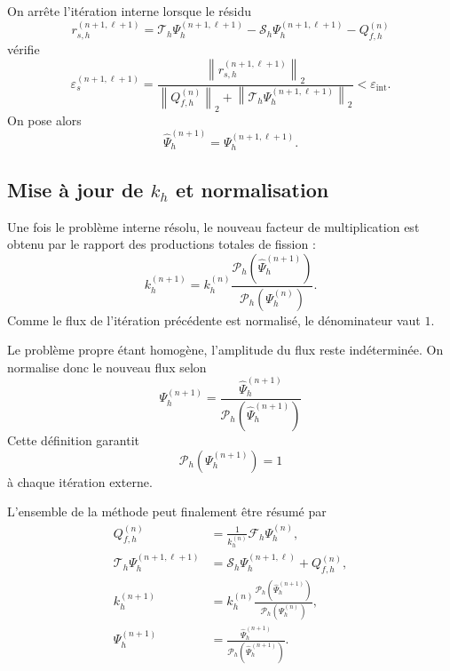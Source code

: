 \documentclass{article}
\begin{document}
On arrête l'itération interne lorsque le résidu
\begin{equation}
    r_{s,h}^{(n+1,\ell+1)}
    = \mathcal T_h\Psi_h^{(n+1,\ell+1)}
    - \mathcal S_h\Psi_h^{(n+1,\ell+1)}
    - Q_{f,h}^{(n)}
    \label{eq:residu-interne-transport}
\end{equation}
vérifie
\begin{equation}
    \varepsilon_s^{(n+1,\ell+1)}
    =
    \frac{\left\| r_{s,h}^{(n+1,\ell+1)} \right\|_2}
    {\left\| Q_{f,h}^{(n)} \right\|_2
    + \left\| \mathcal T_h \Psi_h^{(n+1,\ell+1)} \right\|_2 }
    < \varepsilon_{\mathrm{int}}.
    \label{eq:critere-interne-transport}
\end{equation}
On pose alors
\[
    \widehat{\Psi}_h^{(n+1)} = \Psi_h^{(n+1,\ell+1)}.
\]

\subsection {Mise à jour de $k_h$ et normalisation}

Une fois le problème interne résolu, le nouveau facteur de multiplication est obtenu par le rapport des productions totales de fission :
\begin{equation}
    \boxed{
        k_h^{(n+1)} = k_h^{(n)}
        \frac{\mathcal P_h\!\left( \widehat{\Psi}_h^{(n+1)} \right)}
        {\mathcal P_h\!\left( \Psi_h^{(n)}\right)}.
    }
    \label{eq:mise-a-jour-keff-transport}
\end{equation}
Comme le flux de l'itération précédente est normalisé, le dénominateur vaut $1$.

Le problème propre étant homogène, l'amplitude du flux reste indéterminée. On normalise donc le nouveau flux selon
\begin{equation}
    \boxed{
        \Psi_h^{(n+1)} =
        \frac{\widehat{\Psi}_h^{(n+1)}}
        {\mathcal P_h\!\left(\widehat{\Psi}_h^{(n+1)}\right)}
    }
    \label{eq:normalisation-transport}
\end{equation}
Cette définition garantit
\[
    \mathcal P_h\!\left(\Psi_h^{(n+1)} \right)=1
\]
à chaque itération externe.

L'ensemble de la méthode peut finalement être résumé par
\begin{equation}
\boxed{
\begin{aligned}
    Q_{f,h}^{(n)}
    &=
    \frac{1}{k_h^{(n)}}
    \mathcal F_h\Psi_h^{(n)}, \\[0.15cm]
    \mathcal T_h\Psi_h^{(n+1,\ell+1)} &= \mathcal S_h\Psi_h^{(n+1,\ell)} + Q_{f,h}^{(n)}, \\[0.15cm]
    k_h^{(n+1)}
    &=
    k_h^{(n)}
    \frac{\mathcal P_h(\widehat{\Psi}_h^{(n+1)})}
    {\mathcal P_h(\Psi_h^{(n)})},\\[0.15cm]
    \Psi_h^{(n+1)}
    &= \frac{\widehat{\Psi}_h^{(n+1)}}
    {\mathcal P_h(\widehat{\Psi}_h^{(n+1)})}.
\end{aligned}
}
\label{eq:algorithme-criticite-transport}
\end{equation}
\end{document}
